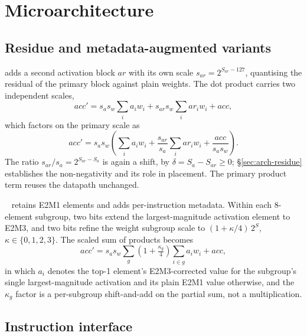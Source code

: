 \section{Microarchitecture}
\label{sec:arch}

\subsection{Residue and metadata-augmented variants}
\label{sec:arch-variants}

\fpfourres{} adds a second activation block $\mathit{ar}$ with its own scale
$s_{ar}=2^{S_{ar}-127}$, quantising the residual of the primary block against
plain \fpfour{} weights. The dot product carries two independent scales,
%
\begin{equation}
  \label{eq:res-base}
  \mathit{acc}' = s_a s_w \sum_i a_i w_i
                + s_{ar} s_w \sum_i \mathit{ar}_i w_i + \mathit{acc},
\end{equation}
%
which factors on the primary scale as
%
\begin{equation}
  \label{eq:res-factor}
  \mathit{acc}' = s_a s_w\!\left( \sum_i a_i w_i
                  + \frac{s_{ar}}{s_a} \sum_i \mathit{ar}_i w_i
                  + \frac{\mathit{acc}}{s_a s_w} \right).
\end{equation}
%
The ratio $s_{ar}/s_a = 2^{S_{ar}-S_a}$ is again a shift, by
$\delta = S_a - S_{ar} \ge 0$; \S\ref{sec:arch-residue} establishes the
non-negativity and its role in placement. The primary product term reuses the
\fpfour{} datapath unchanged.

\mtwo{}~\cite{m2xfp2026} retains E2M1 elements and adds per-instruction
metadata. Within each 8-element subgroup, two bits extend the largest-magnitude
activation element to E2M3, and two bits refine the weight subgroup scale to
$(1+\kappa/4)\,2^{S}$, $\kappa\in\{0,1,2,3\}$. The scaled sum of products
becomes
%
\begin{equation}
  \label{eq:m2}
  \mathit{acc}' = s_a s_w \sum_g \left(1+\tfrac{\kappa_g}{4}\right)
                  \sum_{i \in g} a_i w_i + \mathit{acc},
\end{equation}
%
in which $a_i$ denotes the top-1 element's E2M3-corrected value for the
subgroup's single largest-magnitude activation and its plain E2M1 value
otherwise, and the $\kappa_g$ factor is a per-subgroup shift-and-add on the
partial sum, not a multiplication.

\subsection{Instruction interface}
\label{sec:arch-isa}


